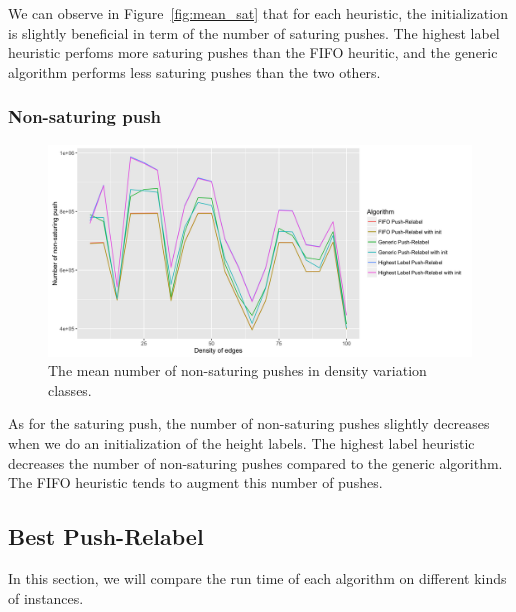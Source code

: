 We can observe in Figure~\ref{fig:mean_sat} that for each heuristic, the initialization is slightly beneficial in term of the number of saturing pushes. The highest label heuristic perfoms more saturing pushes than the FIFO heuritic, and the generic algorithm performs less saturing pushes than the two others.


\subsubsection{Non-saturing push}

\begin{figure}[H]
\begin{center}
\includegraphics[scale=0.125]{images/meannonsaturingpushes.png}
\caption{The mean number of non-saturing pushes in density variation classes.}
\label{fig:mean_non_sat}
\end{center}
\end{figure}

As for the saturing push, the number of non-saturing pushes slightly decreases when we do an initialization of the height labels. The highest label heuristic decreases the number of non-saturing pushes compared to the generic algorithm. The FIFO heuristic tends to augment this number of pushes.


\subsection{Best Push-Relabel}

In this section, we will compare the run time of each algorithm on different kinds of instances.

